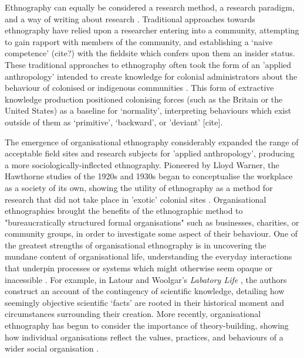 Ethnography can equally be considered a research method, a research paradigm, and a way of writing about research \citep{bate_whatever_1997}. Traditional approaches towards ethnography have relied upon a researcher entering into a community, attempting to gain rapport with members of the community, and establishing a ‘naive competence’ (cite?) with the fieldsite which confers upon them an insider status.  These traditional approaches to ethnography often took the form of an 'applied anthropology' intended to create knowledge for colonial administrators about the behaviour of colonised or indigenous communities \citep{baba_end_2005}.  This form of extractive knowledge production positioned colonising forces (such as the Britain or the United States) as a baseline for ‘normality’, interpreting behaviours which exist outside of them as ‘primitive’, ‘backward’, or 'deviant' [cite]. 

The emergence of organisational ethnography considerably expanded the range of acceptable field sites and research subjects for 'applied anthropology', producing a more sociologically-inflected ethnography. Pioneered by Lloyd Warner, the Hawthorne studies of the 1920s and 1930s began to conceptualise the workplace as a society of its own, showing the utility of ethnography as a method for research that did not take place in 'exotic' colonial sites \citep{neyland_organizational_2007}. Organisational ethnographies brought the benefits of the ethnographic method to "bureaucratically structured formal organisations" \citep{watson_making_2012} such as businesses, charities, or community groups, in order to investigate some aspect of their behaviour. One of the greatest strengths of organisational ethnography is in uncovering the mundane content of organisational life, understanding the everyday interactions that underpin processes or systems which might otherwise seem opaque or inacessible \citep{bate_whatever_1997}. For example, in Latour and Woolgar's \textit{Labatory Life} \citep{latour_laboratory_1986}, the authors construct an account of the contingency of scientific knowledge, detailing how seemingly objective scientific ‘facts’ are rooted in their historical moment and circumstances surrounding their creation. More recently, organisational ethnography has begun to consider the importance of theory-building, showing how individual organisations reflect the values, practices, and behaviours of a wider social organisation \cite{watson_making_2012}. 

